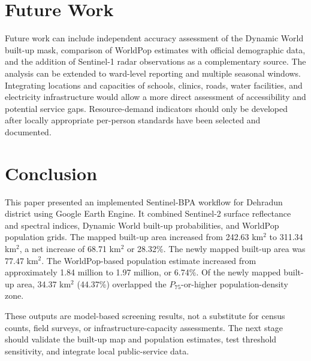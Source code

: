 \documentclass[conference]{IEEEtran}
\begin{document}
\section{Future Work}
Future work can include independent accuracy assessment of the Dynamic World built-up mask, comparison of WorldPop estimates with official demographic data, and the addition of Sentinel-1 radar observations as a complementary source. The analysis can be extended to ward-level reporting and multiple seasonal windows. Integrating locations and capacities of schools, clinics, roads, water facilities, and electricity infrastructure would allow a more direct assessment of accessibility and potential service gaps. Resource-demand indicators should only be developed after locally appropriate per-person standards have been selected and documented.

\section{Conclusion}
This paper presented an implemented Sentinel-BPA workflow for Dehradun district using Google Earth Engine. It combined Sentinel-2 surface reflectance and spectral indices, Dynamic World built-up probabilities, and WorldPop population grids. The mapped built-up area increased from 242.63 km$^2$ to 311.34 km$^2$, a net increase of 68.71 km$^2$ or 28.32\%. The newly mapped built-up area was 77.47 km$^2$. The WorldPop-based population estimate increased from approximately 1.84 million to 1.97 million, or 6.74\%. Of the newly mapped built-up area, 34.37 km$^2$ (44.37\%) overlapped the $P_{75}$-or-higher population-density zone.

These outputs are model-based screening results, not a substitute for census counts, field surveys, or infrastructure-capacity assessments. The next stage should validate the built-up map and population estimates, test threshold sensitivity, and integrate local public-service data.

\balance


\end{document}
